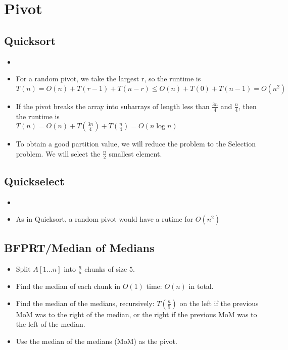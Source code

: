 \documentclass[12pt]{article}
\date{March 4, 2021}
\begin{document}
\maketitle

\section{Pivot}

\subsection{Quicksort}
\begin{itemize}
    \item[] 
    \item For a random pivot, we take the largest r, so the runtime is \\ 
    $T(n) = O(n) + T(r - 1) + T(n - r) \leq O(n) + T(0) + T(n - 1) = O(n^2)$
    \item If the pivot breaks the array into subarrays of length less than $\frac{3n}{4}$ and $\frac{n}{4}$, then the runtime is \\
    $T(n) = O(n) + T(\frac{3n}{4}) + T(\frac{n}{4}) = O(n\log n)$
    \item To obtain a good partition value, we will reduce the problem to the Selection problem. We will select the $\frac{n}{2}$ smallest element.
\end{itemize}

\subsection{Quickselect}
\begin{itemize}
    \item[] 
    \item As in Quicksort, a random pivot would have a rutime for $O(n^2)$
\end{itemize}

\subsection{BFPRT/Median of Medians}
\begin{itemize}
    \item Split $A[1...n]$ into $\frac{n}{5}$ chunks of size $5$.
    \item Find the median of each chunk in $O(1)$ time: $O(n)$ in total.
    \item Find the median of the medians, recursively: $T(\frac{n}{5})$ on the left if the previous MoM was to the right of the median, or the right if the previous MoM was to the left of the median.
    \item Use the median of the medians (MoM) as the pivot.
\end{itemize}
\end{document}
